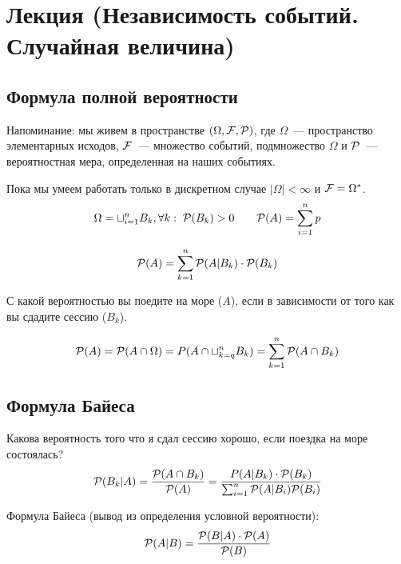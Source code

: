 \section{Лекция (Независимость событий.  Случайная величина)}


\subsection{Формула полной вероятности}
Напоминание: мы живем в пространстве
$(\Omega, \mathcal{F}, \mathcal{P})$, где $\Omega$~--- пространство элементарных исходов,  $\mathcal{F}$~--- множество событий, подмножество $\Omega$  и $\mathcal{P}$~--- вероятностная мера, определенная на наших событиях.

Пока мы умеем работать только в дискретном случае $|\Omega| < \infty$ и $\mathcal{F} = \Omega^*$.
\begin{gather*}
\Omega = \sqcup^n_{i = 1} B_k, \forall k:\; \mathcal{P}(B_k) >0 \qquad 
\mathcal{P}(A) = \sum_{i=1}^n p 
\end{gather*}

\begin{equation}
\mathcal{P}(A) = \sum_{k=1}^n \mathcal{P}(A|B_k) \cdot \mathcal{P}(B_k)
\end{equation}

\begin{example}
    С какой вероятностью вы поедите на море ($A$), если в зависимости от того как вы сдадите сессию ($B_k$).
\end{example}

\begin{gather*}
    \mathcal{P}(A)= \mathcal{P}(A\cap\Omega) = P(A\cap \sqcup_{k=q}^n B_k) = \sum_{k=1}^n \mathcal{P}(A \cap B_k)
\end{gather*}


\subsection{Формула Байеса}
Какова вероятность того что я сдал сессию хорошо, если поездка на море состоялась?
\begin{equation*}
    \mathcal{P}(B_k|A)= \frac{\mathcal{P}(A\cap B_k)}{\mathcal{P}(A)} = 
    \frac{P(A|B_k) \cdot \mathcal{P}(B_k)}{\sum_{i=1}^n \mathcal{P}(A|B_i) \mathcal{P}(B_i)}
\end{equation*}

Формула Байеса (вывод из определения условной вероятности):
\begin{equation} \label{eq:}
    \mathcal{P}(A|B) = \frac{\mathcal{P}(B|A)\cdot \mathcal{P}(A)}{\mathcal{P}(B)}
\end{equation}


